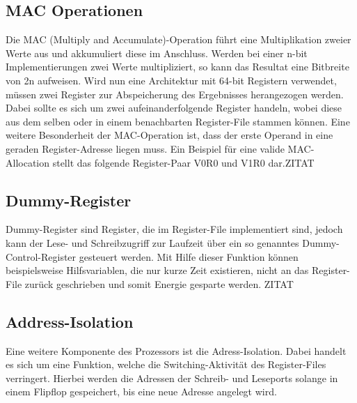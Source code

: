 \subsection{MAC Operationen}\label{subsec:macMode}
Die MAC (Multiply and Accumulate)-Operation führt eine Multiplikation zweier Werte aus und akkumuliert diese im Anschluss. Werden bei einer n-bit Implementierungen zwei Werte multipliziert, so kann das Resultat eine Bitbreite von 2n aufweisen. Wird nun eine Architektur mit 64-bit Registern verwendet, müssen zwei Register zur Abspeicherung des Ergebnisses herangezogen werden. Dabei sollte es sich um zwei aufeinanderfolgende Register handeln, wobei diese aus dem selben oder in einem benachbarten Register-File stammen können. Eine weitere Besonderheit der MAC-Operation ist, dass der erste Operand in eine geraden Register-Adresse liegen muss. Ein Beispiel für eine valide MAC-Allocation stellt das folgende Register-Paar V0R0 und V1R0 dar.ZITAT
  

\subsection{Dummy-Register}\label{subsec:dummy}
Dummy-Register sind Register, die im Register-File implementiert sind, jedoch kann der Lese- und Schreibzugriff zur Laufzeit über ein so genanntes Dummy-Control-Register gesteuert werden. Mit Hilfe dieser Funktion können beispielsweise Hilfsvariablen, die nur kurze Zeit existieren, nicht an das Register-File zurück geschrieben und somit Energie gesparte werden. ZITAT

\subsection{Address-Isolation}\label{subsec:add_iso}
Eine weitere Komponente des Prozessors ist die Adress-Isolation. Dabei handelt es sich um eine Funktion, welche die Switching-Aktivität des Register-Files verringert. Hierbei werden die Adressen der Schreib- und Leseports solange in einem Flipflop gespeichert, bis eine neue Adresse angelegt wird.\cite{lukasglitches2017}


